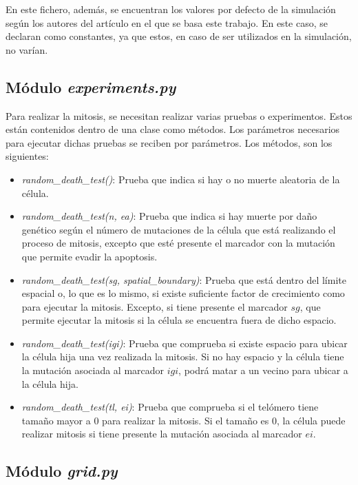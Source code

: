 En este fichero, además, se encuentran los valores por defecto de la simulación según los autores
del artículo \cite{jsantos-amonteagudo-1-2014} en el que se basa este trabajo. En este caso,
se declaran como constantes, ya que estos, en caso de ser utilizados en la simulación, no varían.

\subsection{Módulo \textit{experiments.py}}

Para realizar la mitosis, se necesitan realizar varias pruebas o experimentos. Estos
están contenidos dentro de una clase como métodos. Los parámetros necesarios para ejecutar dichas
pruebas se reciben por parámetros. Los métodos, son los siguientes:

\begin{itemize}
  \item \textit{random\_death\_test()}: Prueba que indica si hay o no muerte aleatoria de la célula.
  \item \textit{random\_death\_test(n, ea)}: Prueba que indica si hay muerte por daño genético según
  el número de mutaciones de la célula que está realizando el proceso de mitosis, excepto que esté
  presente el marcador con la mutación que permite evadir la apoptosis.
  \item \textit{random\_death\_test(sg, spatial\_boundary)}: Prueba que está dentro del
  límite espacial o, lo que es lo mismo, si existe suficiente factor de crecimiento como
  para ejecutar la mitosis. Excepto, si tiene presente el marcador $sg$, que permite
  ejecutar la mitosis si la célula se encuentra fuera de dicho espacio.
  \item \textit{random\_death\_test(igi)}: Prueba que comprueba si existe espacio para ubicar la célula
  hija una vez realizada la mitosis. Si no hay espacio y la célula tiene la mutación asociada al
  marcador $igi$, podrá matar a un vecino para ubicar a la célula hija.
  \item \textit{random\_death\_test(tl, ei)}: Prueba que comprueba si el telómero tiene tamaño
  mayor a $0$ para realizar la mitosis. Si el tamaño es $0$, la célula puede realizar mitosis
  si tiene presente la mutación asociada al marcador $ei$.
\end{itemize}

\subsection{Módulo \textit{grid.py}}

